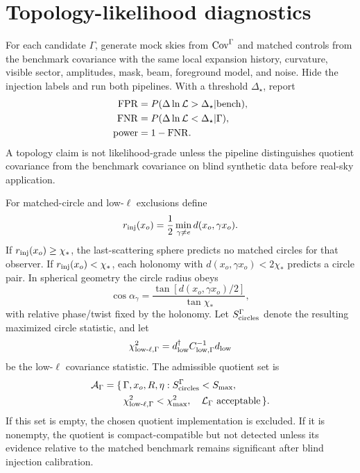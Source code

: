 \documentclass[
  aps,
  prd,
  reprint,
  superscriptaddress,
  floatfix,
  nofootinbib,
  longbibliography
]{revtex4-2}
\theoremstyle{plain}
\theoremstyle{definition}
\theoremstyle{remark}
\begin{document}
\appendix

\section{Topology-likelihood diagnostics}
\label{app:transfer_diagnostics}

For each candidate $\Gamma$, generate mock skies from ${\rm Cov}^\Gamma$ and
matched controls from the benchmark covariance with the same local expansion
history, curvature, visible sector, amplitudes, mask, beam, foreground model,
and noise.  Hide the injection labels and run both pipelines.  With a threshold
$\Delta_\star$, report
\begin{align}
{\rm FPR}&=P(\Delta\ln\mathcal L>\Delta_\star|{\rm bench}),\\
{\rm FNR}&=P(\Delta\ln\mathcal L<\Delta_\star|\Gamma),\\
{\rm power}&=1-{\rm FNR} .
\end{align}
A topology claim is not likelihood-grade unless the pipeline distinguishes
quotient covariance from the benchmark covariance on blind synthetic data before
real-sky application.

For matched-circle and low-$\ell$ exclusions define
\begin{equation}
r_{\rm inj}(x_o)=\frac{1}{2}\min_{\gamma\ne e}d(x_o,\gamma x_o) .
\end{equation}
If $r_{\rm inj}(x_o)\ge\chi_*$, the last-scattering sphere predicts no matched
circles for that observer.  If $r_{\rm inj}(x_o)<\chi_*$, each holonomy with
$d(x_o,\gamma x_o)<2\chi_*$ predicts a circle pair.  In spherical geometry the
circle radius obeys
\begin{equation}
\cos\alpha_\gamma=
\frac{\tan[d(x_o,\gamma x_o)/2]}{\tan\chi_*},
\end{equation}
with relative phase/twist fixed by the holonomy.  Let
$S_{\rm circles}^\Gamma$ denote the resulting maximized circle statistic, and
let
\begin{equation}
\chi^2_{{\rm low}\text{-}\ell,\Gamma}
=d_{\rm low}^\dagger C_{{\rm low},\Gamma}^{-1}d_{\rm low}
\end{equation}
be the low-$\ell$ covariance statistic.  The admissible quotient set is
\begin{equation}
\begin{aligned}
\mathcal A_\Gamma=\{\,&\Gamma,x_o,R,\eta:
S_{\rm circles}^\Gamma<S_{\rm max},\\
&\chi^2_{{\rm low}\text{-}\ell,\Gamma}<\chi^2_{\rm max},
\quad
\mathcal L_\Gamma\ \hbox{acceptable}\,\} .
\end{aligned}
\label{eq:admissible_quotient_set_v16}
\end{equation}
If this set is empty, the chosen quotient implementation is excluded.  If it is
nonempty, the quotient is compact-compatible but not detected unless its
evidence relative to the matched benchmark remains significant after blind
injection calibration.
\end{document}
